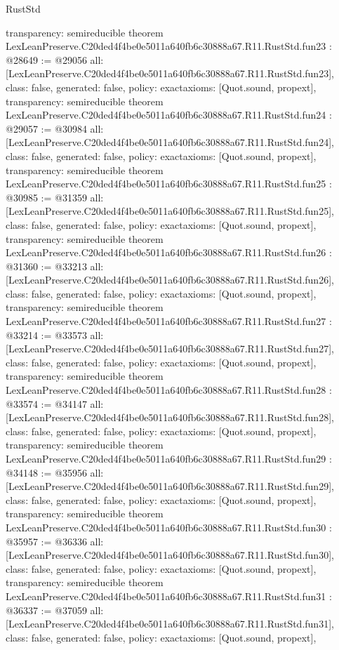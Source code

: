 \begin{lexlean}{RustStd}
\begin{coremodule}
{  transparency: semireducible
}
theorem LexLeanPreserve.C20ded4f4be0e5011a640fb6c30888a67.R11.RustStd.fun23 : @28649 := @29056 {
  all: [LexLeanPreserve.C20ded4f4be0e5011a640fb6c30888a67.R11.RustStd.fun23],
  class: false,
  generated: false,
  policy: exact{axioms: [Quot.sound, propext]},
  transparency: semireducible
}
theorem LexLeanPreserve.C20ded4f4be0e5011a640fb6c30888a67.R11.RustStd.fun24 : @29057 := @30984 {
  all: [LexLeanPreserve.C20ded4f4be0e5011a640fb6c30888a67.R11.RustStd.fun24],
  class: false,
  generated: false,
  policy: exact{axioms: [Quot.sound, propext]},
  transparency: semireducible
}
theorem LexLeanPreserve.C20ded4f4be0e5011a640fb6c30888a67.R11.RustStd.fun25 : @30985 := @31359 {
  all: [LexLeanPreserve.C20ded4f4be0e5011a640fb6c30888a67.R11.RustStd.fun25],
  class: false,
  generated: false,
  policy: exact{axioms: [Quot.sound, propext]},
  transparency: semireducible
}
theorem LexLeanPreserve.C20ded4f4be0e5011a640fb6c30888a67.R11.RustStd.fun26 : @31360 := @33213 {
  all: [LexLeanPreserve.C20ded4f4be0e5011a640fb6c30888a67.R11.RustStd.fun26],
  class: false,
  generated: false,
  policy: exact{axioms: [Quot.sound, propext]},
  transparency: semireducible
}
theorem LexLeanPreserve.C20ded4f4be0e5011a640fb6c30888a67.R11.RustStd.fun27 : @33214 := @33573 {
  all: [LexLeanPreserve.C20ded4f4be0e5011a640fb6c30888a67.R11.RustStd.fun27],
  class: false,
  generated: false,
  policy: exact{axioms: [Quot.sound, propext]},
  transparency: semireducible
}
theorem LexLeanPreserve.C20ded4f4be0e5011a640fb6c30888a67.R11.RustStd.fun28 : @33574 := @34147 {
  all: [LexLeanPreserve.C20ded4f4be0e5011a640fb6c30888a67.R11.RustStd.fun28],
  class: false,
  generated: false,
  policy: exact{axioms: [Quot.sound, propext]},
  transparency: semireducible
}
theorem LexLeanPreserve.C20ded4f4be0e5011a640fb6c30888a67.R11.RustStd.fun29 : @34148 := @35956 {
  all: [LexLeanPreserve.C20ded4f4be0e5011a640fb6c30888a67.R11.RustStd.fun29],
  class: false,
  generated: false,
  policy: exact{axioms: [Quot.sound, propext]},
  transparency: semireducible
}
theorem LexLeanPreserve.C20ded4f4be0e5011a640fb6c30888a67.R11.RustStd.fun30 : @35957 := @36336 {
  all: [LexLeanPreserve.C20ded4f4be0e5011a640fb6c30888a67.R11.RustStd.fun30],
  class: false,
  generated: false,
  policy: exact{axioms: [Quot.sound, propext]},
  transparency: semireducible
}
theorem LexLeanPreserve.C20ded4f4be0e5011a640fb6c30888a67.R11.RustStd.fun31 : @36337 := @37059 {
  all: [LexLeanPreserve.C20ded4f4be0e5011a640fb6c30888a67.R11.RustStd.fun31],
  class: false,
  generated: false,
  policy: exact{axioms: [Quot.sound, propext]},
}
\end{coremodule}
\end{lexlean}
